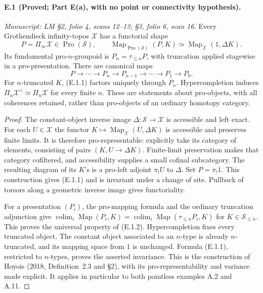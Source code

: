 \paragraph{E.1 (Proved; Part E(a), with no point or connectivity hypothesis).}
\textit{Manuscript: LM \S2, folio 4, scans 12--13; \S3, folio 6, scan 16.}
Every Grothendieck infinity-topos $\mathcal X$ has a functorial shape
\[
 P=\Pi_\infty\mathcal X\in\operatorname{Pro}(\mathcal S),\qquad
 \operatorname{Map}_{\operatorname{Pro}(\mathcal S)}(P,K)
       \simeq\operatorname{Map}_{\mathcal X}(1,\Delta K).
                                                        \tag{E.1.1}
\]
Its fundamental pro-$n$-groupoid is $P_n=\tau_{\le n}P$, with truncation applied stagewise in a pro-presentation. There are canonical maps
\[
 P\longrightarrow\cdots\longrightarrow P_n\longrightarrow P_{n-1}
                 \longrightarrow\cdots\longrightarrow P_1\longrightarrow P_0.
                                                        \tag{E.1.2}
\]
For $n$-truncated $K$, (E.1.1) factors uniquely through $P_n$. Hypercompletion induces $\Pi_n\mathcal X^\wedge\simeq\Pi_n\mathcal X$ for every finite $n$. These are statements about pro-objects, with all coherences retained, rather than pro-objects of an ordinary homotopy category.
\begin{proof}
The constant-object inverse image $\Delta:\mathcal S\to\mathcal X$ is accessible and left exact. For each $U\in\mathcal X$ the functor $K\mapsto\operatorname{Map}_{\mathcal X}(U,\Delta K)$ is accessible and preserves finite limits. It is therefore pro-representable: explicitly take its category of elements, consisting of pairs $(K,U\to\Delta K)$. Finite-limit preservation makes that category cofiltered, and accessibility supplies a small cofinal subcategory. The resulting diagram of its $K$'s is a pro-left adjoint $\pi_!U$ to $\Delta$. Set $P=\pi_!1$. This construction gives (E.1.1) and is invariant under a change of site. Pullback of torsors along a geometric inverse image gives functoriality.

For a presentation $(P_i)$, the pro-mapping formula and the ordinary truncation adjunction give
$\operatorname{colim}_i\operatorname{Map}(P_i,K)
 =\operatorname{colim}_i\operatorname{Map}(\tau_{\le n}P_i,K)$
for $K\in\mathcal S_{\le n}$. This proves the universal property of (E.1.2). Hypercompletion fixes every truncated object. The constant object associated to an $n$-type is already $n$-truncated, and its mapping space from $1$ is unchanged. Formula (E.1.1), restricted to $n$-types, proves the asserted invariance. This is the construction of Hoyois (2018, Definition~2.3 and \S2), with its pro-representability and variance made explicit. It applies in particular to both pointless examples A.2 and A.11. 
\end{proof}

